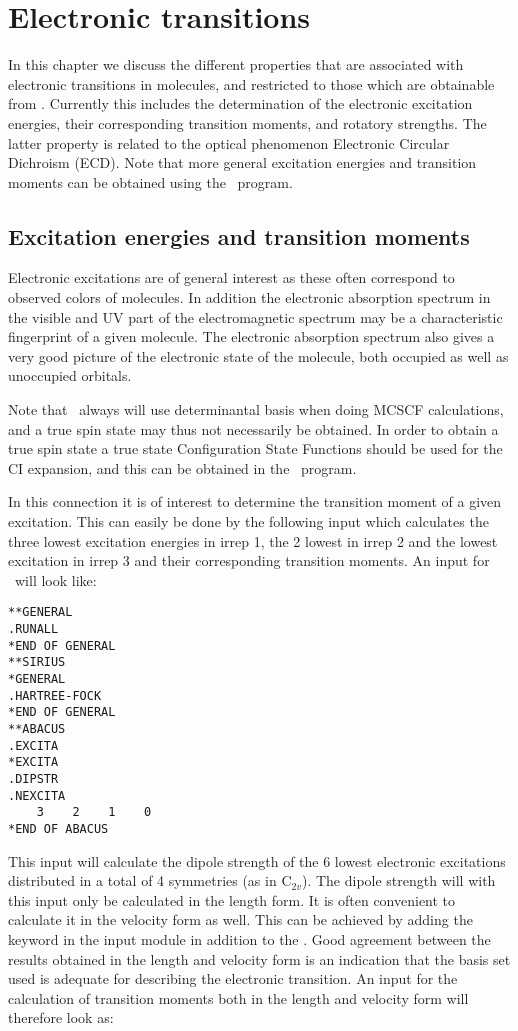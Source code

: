 \chapter{Electronic transitions}\label{ch:electronic}

In this chapter we discuss the different properties that are
associated with electronic transitions in molecules, and restricted to
those which are
obtainable from \aba . Currently this includes the determination of
the electronic excitation energies, their corresponding transition
moments, and  rotatory strengths. The latter property is related  to
the optical phenomenon Electronic Circular Dichroism (ECD). Note that
more general excitation energies and transition moments can be
obtained using the \resp\ program.

\section{Excitation energies and transition moments}\label{sec:excitation}

Electronic excitations are of general interest as these often
correspond to observed colors of molecules. In addition the
electronic absorption spectrum in the visible and UV part of
the electromagnetic spectrum may be a characteristic fingerprint of a
given molecule. The electronic
absorption spectrum also gives a very good picture of the electronic
state of the molecule, both occupied as well as unoccupied orbitals. 

Note that \aba\ always will use
determinantal basis when doing MCSCF calculations, and a true spin
state may thus not necessarily be obtained. In order to obtain a true
spin state a true state Configuration State Functions should be used
for the CI expansion, and this can be obtained in the \resp\
program. 

In this connection it is of interest to determine the transition
moment of a given excitation. This can easily be done by the following
input which calculates the three lowest excitation energies in irrep 1, the 2
lowest in irrep 2 and the lowest excitation in irrep 3 and their
corresponding transition moments. An input for \aba\ will look like:

\begin{verbatim}
**GENERAL
.RUNALL
*END OF GENERAL
**SIRIUS
*GENERAL
.HARTREE-FOCK
*END OF GENERAL
**ABACUS
.EXCITA
*EXCITA
.DIPSTR
.NEXCITA
    3    2    1    0
*END OF ABACUS
\end{verbatim}
This input will calculate the dipole strength  of the
6 lowest electronic excitations distributed in a total of 4 symmetries
(as in C$_{2v}$). The dipole strength will with this input only be
calculated in the length form. It is often convenient to calculate it
in the velocity form as well. This can be achieved by adding the
keyword \Key{ROTVEL} in the \Sec{EXCITA} input module in addition
to the \Key{DIPSTR}. Good agreement between the results
obtained in the length and velocity form is an indication that the
basis set used is adequate for describing the electronic transition.
An input for the calculation of transition moments both in the length
and velocity form will therefore look as:


